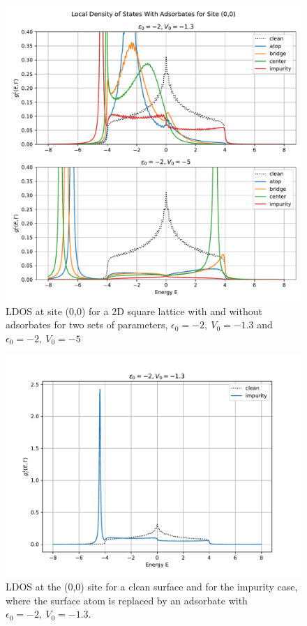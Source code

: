 \begin{figure}[H]
    \centering    \includegraphics[width=\textwidth]{Figures/task4-11(1).pdf}
    \caption{LDOS at site (0,0) for a 2D square lattice with and without adsorbates for two sets of parameters, $\epsilon_0=-2,\:V_0=-1.3$ and $\epsilon_0=-2,\:V_0=-5$}
    \label{fig:task4(1)}
\end{figure}

\begin{figure}[H]
    \centering    \includegraphics[width=\textwidth]{Figures/task4-imp.pdf}
    \caption{LDOS at the (0,0) site for a clean surface and for the impurity case, where the surface atom is replaced by an adsorbate with $\epsilon_0=-2,\:V_0=-1.3$.}
    \label{fig:task4imp}
\end{figure}


